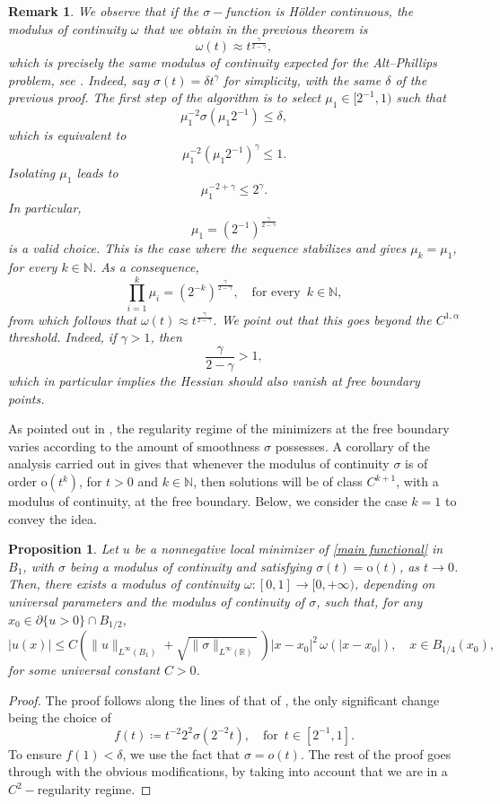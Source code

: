 \documentclass[reqno,11pt]{amsart}
\newtheorem{proposition}{Proposition}[section]
\newtheorem{remark}{Remark}[section]
\newcommand{\1}{\mathds{1}}  %
\numberwithin{equation}{section}
\begin{document}
\begin{remark} \label{rem}
We observe that if the $\sigma-$function is H\"older continuous, the modulus of continuity $\omega$ that we obtain in the previous theorem is
$$
    \omega(t) \approx t^{\frac{\gamma}{2-\gamma}},
$$
which is precisely the same modulus of continuity expected for the Alt--Phillips problem, see . Indeed, say $\sigma(t) = \delta t^{\gamma}$ for simplicity, with the same $\delta$ of the previous proof. The first step of the algorithm is to select $\mu_1 \in [2^{-1},1)$ such that
$$
    \mu_1^{-2} \sigma(\mu_1 2^{-1}) \leq \delta,
$$
which is equivalent to
$$
    \mu_1^{-2} (\mu_1 2^{-1})^\gamma \leq 1.
$$
Isolating $\mu_1$ leads to
$$
    \mu_1^{-2+\gamma} \leq 2^\gamma.
$$
In particular,
$$
    \mu_1 = \left(2^{-1}\right)^{\frac{\gamma}{2-\gamma}}
$$
is a valid choice. This is the case where the sequence stabilizes and gives $\mu_k = \mu_1$, for every $k \in \mathbb{N}$. As a consequence, 
$$
    \prod_{i=1}^k \mu_i = \left(2^{-k}\right)^{\frac{\gamma}{2-\gamma}}, \quad \text{for every }\, k \in \mathbb{N},
$$
from which follows that $\omega(t) \approx t^{\frac{\gamma}{2-\gamma}}$. We point out that this goes beyond the $C^{1,\alpha}$ threshold. Indeed, if $\gamma > 1$, then
$$
    \frac{\gamma}{2-\gamma} > 1,
$$
which in particular implies the Hessian should also vanish at free boundary points.
\end{remark}

As pointed out in , the regularity regime of the minimizers at the free boundary varies according to the amount of smoothness $\sigma$ possesses. A corollary of the analysis carried out in  gives that whenever the modulus of continuity $\sigma$ is of order $\mathrm{o} (t^k )$, for $t>0$ and $k \in \mathbb{N}$, then solutions will be of class $C^{k+1}$, with a modulus of continuity, at the free boundary. Below, we consider the case $k=1$ to convey the idea.

\begin{proposition}
Let $u$ be a nonnegative local minimizer of \eqref{main functional} in $B_1$, with $\sigma$ being a modulus of continuity and satisfying
$\sigma(t) = \mathrm{o}(t)$, as $t \to 0$. Then, there exists a modulus of continuity $\omega \colon [0,1] \to [0,+\infty)$, depending on universal parameters and the modulus of continuity of $\sigma$, such that, for any $x_0 \in \partial \{u>0\}\cap B_{1/2}$, 
$$
    |u(x)| \leq C\left(\|u\|_{L^\infty(B_1)} + \sqrt{\|\sigma\|_{L^\infty(\mathbb{R})}}\, \right)|x-x_0|^2\,\omega(|x-x_0|), \quad x \in B_{1/4}(x_0),
$$
for some universal constant $C>0$.
\end{proposition}
 \begin{proof}
The proof follows along the lines of that of , the only significant change being the choice of 
$$
    f(t) \coloneqq t^{-2} 2^2\sigma(2^{-2}t), \quad \text{for }\, t \in [2^{-1},1].
$$
To ensure $f(1) < \delta$, we use the fact that $\sigma = o(t)$. The rest of the proof goes through with the obvious modifications, by taking into account that we are in a $C^2-$regularity regime.
\end{proof}
\end{document}
